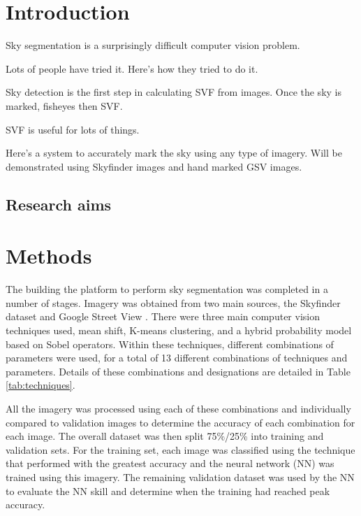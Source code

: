 \documentclass[final,3p,times,authoryear]{elsarticle}
\begin{document}
\section{Introduction}\label{sec:introduction}

Sky segmentation is a surprisingly difficult computer vision problem. 

Lots of people have tried it. Here's how they tried to do it.

Sky detection is the first step in calculating SVF from images. Once the sky is marked, fisheyes then SVF.

SVF is useful for lots of things.

Here's a system to accurately mark the sky using any type of imagery. Will be demonstrated using Skyfinder images and hand marked GSV images.


\subsection{Research aims}





\section{Methods}\label{sec:Methods}

The building the platform to perform sky segmentation was completed in a number of stages. Imagery was obtained from two main sources, the Skyfinder dataset \citep{Mihail2016} and Google Street View \citep{GoogleMaps2017b}. There were three main computer vision techniques used, mean shift, K-means clustering, and a hybrid probability model based on Sobel operators. Within these techniques, different combinations of parameters were used, for a total of 13 different combinations of techniques and parameters. Details of these combinations and designations are detailed in Table \ref{tab:techniques}.

All the imagery was processed using each of these combinations and individually compared to validation images to determine the accuracy of each combination for each image. The overall dataset was then split 75\%/25\% into training and validation sets. For the training set, each image was classified using the technique that performed with the greatest accuracy and the neural network (NN) was trained using this imagery. The remaining validation dataset was used by the NN to evaluate the NN skill and determine when the training had reached peak accuracy.
\end{document}
